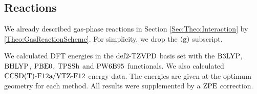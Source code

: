 \subsection{Reactions}
\label{Sec:Gas:Reaction}
We already described gas-phase reactions in Section \ref{Sec:Theo:Interaction}
by \eqref{Theo:GasReactionScheme}. For simplicity, we drop the $(\text g)$ subscript.

We calculated DFT energies in the $\text{def2-TZVPD}$ basis set with
the $\text{B3LYP}$, $\text{BHLYP}$, $\text{PBE0}$, $\text{TPSSh}$ and $\text{PW6B95}$ 
functionals. We also calculated $\text{CCSD(T)-F12a}/\text{VTZ-F}12$ energy data. The energies are
given at the optimum geometry for each method. All
results were supplemented by a $\text{ZPE}$ correction. 



